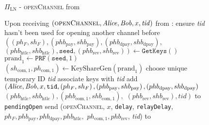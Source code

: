 \begin{figure}[!htbp]
\begin{protocolbox}{$\Pi_{\mathrm{LN}}$ - \textsc{openChannel} from
\environment}
  \begin{algorithmic}[1]
    \State Upon receiving $\left(\textsc{openChannel}, \mathit{Alice}, \mathit{Bob}, x,
    \mathit{tid}\right)$ from \environment:
    \Indent
      \State ensure \textit{tid} hasn't been used for opening another channel
      before
      \State $\left(\left(ph_F, sh_F\right), \left(phb_{\mathrm{pay}},
      shb_{\mathrm{pay}}\right), \left(phb_{\mathrm{dpay}},
      shb_{\mathrm{dpay}}\right),\right.$
      $\left.\left(phb_{\mathrm{htlc}}, shb_{\mathrm{htlc}}\right),
      \mathtt{seed}, \left(phb_{\mathrm{rev}}, shb_{\mathrm{rev}}\right)\right)
      \gets \texttt{GetKeys}\left(\right)$
      \State $\mathrm{prand}_1 \gets \texttt{PRF}\left(\mathtt{seed}, 1\right)$
      \State $\left(sh_{\mathrm{com}, 1}, ph_{\mathrm{com}, 1}\right) \gets
      \mathrm{KeyShareGen}\left(\mathrm{prand}_1\right)$
      \State choose unique temporary ID \textit{tid} 
      \State associate keys with \textit{tid}
      \State add $\left(\mathit{Alice}, \mathit{Bob}, x, \mathtt{tid}, \left(ph_F, sh_F\right),
      \left(phb_{\mathrm{pay}}, shb_{\mathrm{pay}}\right),
      \left(phb_{\mathrm{dpay}}, shb_{\mathrm{dpay}}\right)\right.$
      $\left.\left(phb_{\mathrm{htlc}}, shb_{\mathrm{htlc}}\right),
      \left(phb_{\mathrm{com}, 1}, shb_{\mathrm{com}, 1}\right),\right.$
      $\left.\left(phb_{\mathrm{rev}}, shb_{\mathrm{rev}}\right),
      \mathit{tid}\right)$ to \texttt{pendingOpen}
      \State send (\textsc{openChannel}, $x$, \texttt{delay},
      \texttt{relayDelay}, $ph_F, phb_{\mathrm{pay}},
      phb_{\mathrm{dpay}}, phb_{\mathrm{htlc}},$
      $ph_{\mathrm{com}, 1}, phb_{\mathrm{rev}}$, \textit{tid}) to
      \bob{}
    \EndIndent
  \end{algorithmic}
\end{protocolbox}
\caption{}
\label{alg:protocol:open:env}
\end{figure}

